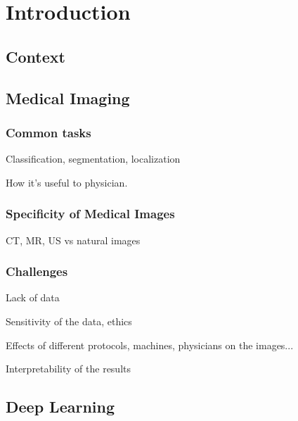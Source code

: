\chapter{Introduction}
\label{chap:intro}

\minitoc

\newpage

\section{Context}

\section{Medical Imaging}

\subsection{Common tasks}

Classification, segmentation, localization

How it's useful to physician.

\subsection{Specificity of Medical Images}

CT, MR, US
vs
natural images

\subsection{Challenges}

Lack of data

Sensitivity of the data, ethics

Effects of different protocols, machines, physicians on the images...

Interpretability of the results

\section{Deep Learning}

